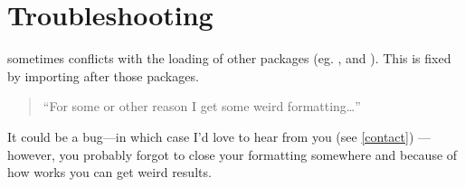 \documentclass[11pt, cm-default]{l3doc}
\begin{document}
	\section{Troubleshooting}
	 sometimes conflicts with the loading of other packages (eg.
	,  and ). This is fixed by importing
	 after those packages.
	
	\begin{quotation}
		``For some or other reason I get some weird formatting\dots''
	\end{quotation}

	It could be a bug---in which case I'd love to hear from you (see \ref{contact})
	---however, you probably forgot to close your formatting somewhere and because
	of how  works you can get weird results.



	
	
\end{document}
